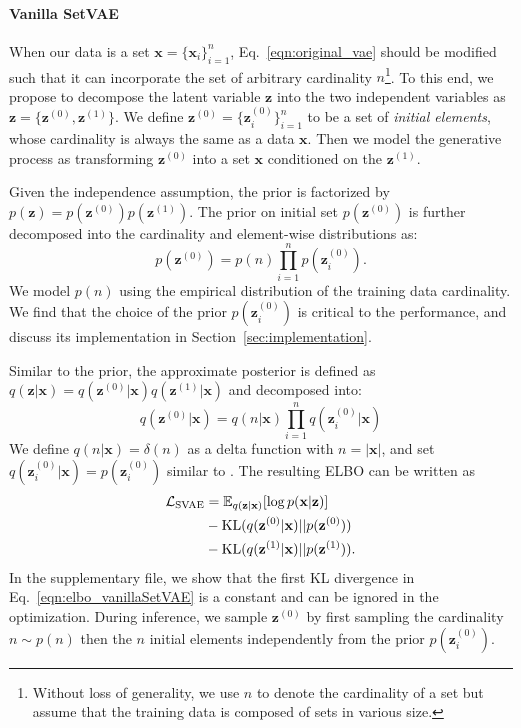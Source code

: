 \documentclass[final]{arxiv/cvpr}
\newcommand{\cutparagraphup}{\vspace*{-0.1in}}
\begin{document}
\cutparagraphup
\paragraph{Vanilla SetVAE}
When our data is a set $\mathbf{x}=\{\mathbf{x}_i\}_{i=1}^n$, Eq.~\eqref{eqn:original_vae} should be modified such that it can incorporate the set of arbitrary cardinality $n$\footnote{Without loss of generality, we use $n$ to denote the cardinality of a set but assume that the training data is composed of sets in various size.}.
To this end, we propose to decompose the latent variable $\mathbf{z}$ into the two independent variables as $\mathbf{z}=\{\mathbf{z}^{(0)}, \mathbf{z}^{(1)}\}$.
We define $\mathbf{z}^{(0)}=\{\mathbf{z}_i^{(0)}\}_{i=1}^n$ to be a set of \textit{initial elements}, whose cardinality is always the same as a data $\mathbf{x}$. 
Then we model the generative process as transforming $\mathbf{z}^{(0)}$ into a set $\mathbf{x}$ conditioned on the $\mathbf{z}^{(1)}$.

Given the independence assumption, the prior is factorized by $p(\mathbf{z})=p(\mathbf{z}^{(0)})p(\mathbf{z}^{(1)})$.
The prior on initial set $p(\mathbf{z}^{(0)})$ is further decomposed into the cardinality and element-wise distributions as:
\begin{equation}
    p(\mathbf{z}^{(0)}) = p(n)\prod_{i=1}^np(\mathbf{z}_{i}^{(0)}).
    \label{eqn:prior_initialset}
\end{equation}
We model $p(n)$ using the empirical distribution of the training data cardinality.
We find that the choice of the prior $p(\mathbf{z}_i^{(0)})$ is critical to the performance, and discuss its implementation in Section~\ref{sec:implementation}.

Similar to the prior, the approximate posterior is defined as $q(\mathbf{z}|\mathbf{x}) = q(\mathbf{z}^{(0)}|\mathbf{x})q(\mathbf{z}^{(1)}|\mathbf{x})$ and decomposed into:
\begin{equation}
    q(\mathbf{z}^{(0)}|\mathbf{x}) = q(n|\mathbf{x})\prod_{i=1}^nq(\mathbf{z}_{i}^{(0)}|\mathbf{x})
    \label{eqn:posterior_vanillaSetVAE}
\end{equation}
We define $q(n|\mathbf{x})=\delta(n)$ as a delta function with $n=|\mathbf{x}|$, and set $q(\mathbf{z}_{i}^{(0)}|\mathbf{x}) = p(\mathbf{z}_{i}^{(0)})$ similar to \cite{yang2019pointflow, kosiorek2020conditional, locatello2020objectcentric}.
The resulting ELBO can be written as
\begin{align}
    \mathcal{L}_{\text{SVAE}}&= \mathbb{E}_{q(\mathbf{z}|\mathbf{x})}{\left[ \log p(\mathbf{x}|\mathbf{z}) \right]} \nonumber\\
    &- \textnormal{KL}(q(\mathbf{z}^{(0)}|\mathbf{x})||p(\mathbf{z}^{(0)})) \nonumber\\
    &- \textnormal{KL}(q(\mathbf{z}^{(1)}|\mathbf{x})||p(\mathbf{z}^{(1)})).
    \label{eqn:elbo_vanillaSetVAE}
\end{align}
In the supplementary file, we show that the first KL divergence in Eq.~\eqref{eqn:elbo_vanillaSetVAE} is a constant and can be ignored in the optimization.
During inference, we sample $\mathbf{z}^{(0)}$ by first sampling the cardinality $n\sim p(n)$ then the $n$ initial elements independently from the prior $p(\mathbf{z}_{i}^{(0)})$.
\end{document}
